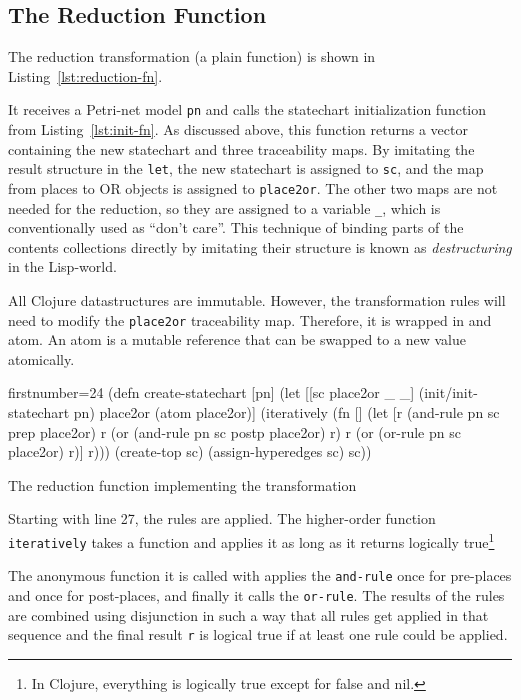 \documentclass[11pt]{article}
\begin{document}
\subsection{The Reduction Function}
\label{sec:reduction-function}

The reduction transformation (a plain function) is shown in
Listing~\ref{lst:reduction-fn}.

It receives a Petri-net model \verb|pn| and calls the statechart initialization
function from Listing~\ref{lst:init-fn}.  As discussed above, this function
returns a vector containing the new statechart and three traceability maps.  By
imitating the result structure in the \verb|let|, the new statechart is
assigned to \verb|sc|, and the map from places to OR objects is assigned to
\verb|place2or|.  The other two maps are not needed for the reduction, so they
are assigned to a variable \verb|_|, which is conventionally used as ``don't
care''.  This technique of binding parts of the contents collections directly
by imitating their structure is known as \emph{destructuring} in the
Lisp-world.

All Clojure datastructures are immutable.  However, the transformation rules
will need to modify the \verb|place2or| traceability map.  Therefore, it is
wrapped in and atom.  An atom is a mutable reference that can be swapped to a
new value atomically.

\begin{listing}[H]
  \begin{clojurecode*}{firstnumber=24}
(defn create-statechart [pn]
  (let [[sc place2or _ _] (init/init-statechart pn)
        place2or (atom place2or)]
    (iteratively (fn []
                   (let [r     (and-rule pn sc prep  place2or)
                         r (or (and-rule pn sc postp place2or) r)
                         r (or (or-rule  pn sc place2or)       r)]
                     r)))
    (create-top sc)
    (assign-hyperedges sc)
    sc))
  \end{clojurecode*}
  \label{lst:reduction-fn}
  \caption{The reduction function implementing the transformation}
\end{listing}


Starting with line 27, the rules are applied.  The higher-order function
\verb|iteratively| takes a function and applies it as long as it returns
logically true\footnote{In Clojure, everything is logically true except for
  \textsf{false} and \textsf{nil}.}

The anonymous function it is called with applies the \verb|and-rule| once for
pre-places and once for post-places, and finally it calls the \verb|or-rule|.
The results of the rules are combined using disjunction in such a way that all
rules get applied in that sequence and the final result \verb|r| is logical
true if at least one rule could be applied.
\end{document}

